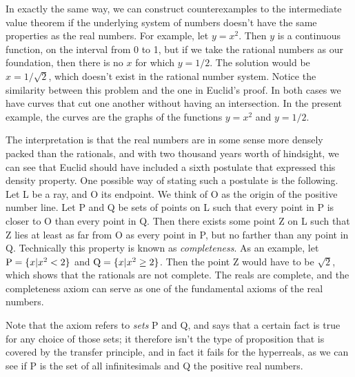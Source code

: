 In exactly the same way, we can construct counterexamples to the intermediate value theorem if
the underlying system of numbers doesn't have the same properties as the real numbers. For example,
let $y=x^2$. Then $y$ is a continuous function, on the interval from 0 to 1, but if we take the rational
numbers as our foundation, then there is no $x$ for which $y=1/2$. The solution would be $x=1/\sqrt{2}$, which
doesn't exist in the rational number system. Notice the similarity between this problem and the one in
Euclid's proof. In both cases we have curves that cut one another without having an intersection.
In the present example, the curves are the graphs of the functions $y=x^2$ and $y=1/2$.

The interpretation is that the real numbers are in some sense more densely packed than the rationals,
and with two thousand years worth of hindsight, we can see that Euclid should have included a
sixth postulate that expressed this density property. One possible way of stating such a postulate
is the following. Let L be a ray, and O its endpoint. We think of O as the
origin of the positive number line.
Let P and Q be sets of points on L such that every point in P is closer to O than every point in Q.
Then there exists some point Z on L such that Z lies at least as far from O as every point in P,
but no farther than any point in Q. Technically this property is known as \emph{completeness}.\label{compactness}
As an example, let $\textup{P}=\{x|x^2<2\}$ and $\textup{Q}=\{x|x^2 \ge 2\}$. Then the point Z would have to be $\sqrt{2}$,
which shows that the rationals are not complete. The reals are complete, and the completeness
axiom can serve as one of the fundamental axioms of the real numbers.

Note that the axiom
refers to \emph{sets} P and Q, and says that a certain fact is true for any choice of those sets;
it therefore isn't the type of proposition that is covered by the transfer principle, and in fact
it fails for the hyperreals, as we can see if P is the set of all infinitesimals and Q the
positive real numbers.

